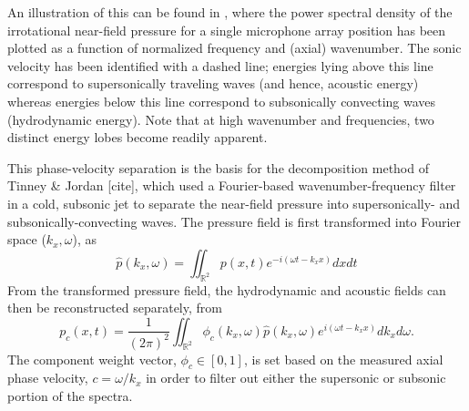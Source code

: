 An illustration of this can be found in , where the power spectral density of the irrotational near-field pressure for a single microphone array position has been plotted as a function of normalized frequency and (axial) wavenumber.
The sonic velocity has been identified with a dashed line; energies lying above this line correspond to supersonically traveling waves (and hence, acoustic energy) whereas energies below this line correspond to subsonically convecting waves (hydrodynamic energy).
Note that at high wavenumber and frequencies, two distinct energy lobes become readily apparent.

This phase-velocity separation is the basis for the decomposition method of Tinney \& Jordan [cite], which used a Fourier-based wavenumber-frequency filter in a cold, subsonic jet to separate the near-field pressure into supersonically- and subsonically-convecting waves.
The pressure field is first transformed into Fourier space ($k_x,\omega$), as
\begin{equation}
	\hat{p} \left( k_x , \omega \right) = \iint_{\mathbb{R}^2} p(x,t)e^{-i(\omega t - k_x x)}dxdt
\end{equation}
From the transformed pressure field, the hydrodynamic and acoustic fields can then be reconstructed separately, from
\begin{equation}
	p_c (x,t) = \frac{1}{(2 \pi)^2} \iint_{\mathbb{R}^2} \phi_c (k_x,\omega) \hat{p} (k_x,\omega)e^{i(\omega t - k_x x)}dk_x d\omega .
	\label{eq:fourier_filter}
\end{equation}
The component weight vector, $\phi_c \in [0,1]$, is set based on the measured axial phase velocity, $c = \omega / k_x$ in order to filter out either the supersonic or subsonic portion of the spectra. 
 
